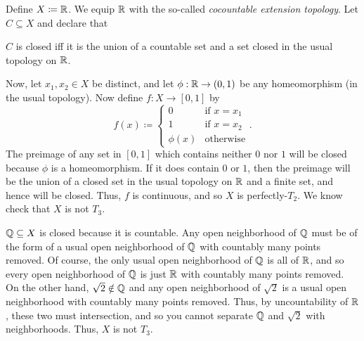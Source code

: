 \begin{exm}\label{CocountableExtensionTopology}
Define $X\coloneqq \mathbb{R}$.  We equip $\mathbb{R}$ with the so-called \emph{cocountable extension topology}.  Let $C\subseteq X$ and declare that
\begin{textequation}
$C$ is closed iff it is the union of a countable set and a set closed in the usual topology on $\mathbb{R}$.
\end{textequation}

Now, let $x_1,x_2\in X$ be distinct, and let $\phi :\mathbb{R} \rightarrow (0,1)$ be any homeomorphism (in the usual topology).  Now define $f:X\rightarrow [0,1]$ by
\begin{equation}
f(x)\coloneqq \begin{cases}0 & \text{if }x=x_1 \\ 1 & \text{if }x=x_2 \\ \phi (x) & \text{otherwise}\end{cases}.
\end{equation}
The preimage of any set in $[0,1]$ which contains neither $0$ nor $1$ will be closed because $\phi$ is a homeomorphism.  If it does contain $0$ or $1$, then the preimage will be the union of a closed set in the usual topology on $\mathbb{R}$ and a finite set, and hence will be closed.  Thus, $f$ is continuous, and so $X$ is perfectly-$T_2$.  We know check that $X$ is not $T_3$.

$\mathbb{Q} \subseteq X$ is closed because it is countable.  Any open neighborhood of $\mathbb{Q}$ must be of the form of a usual open neighborhood of $\mathbb{Q}$ with countably many points removed.  Of course, the only usual open neighborhood of $\mathbb{Q}$ is all of $\mathbb{R}$, and so every open neighborhood of $\mathbb{Q}$ is just $\mathbb{R}$ with countably many points removed.  On the other hand, $\sqrt{2}\notin \mathbb{Q}$ and any open neighborhood of $\sqrt{2}$ is a usual open neighborhood with countably many points removed.  Thus, by uncountability of $\mathbb{R}$, these two must intersection, and so you cannot separate $\mathbb{Q}$ and $\sqrt{2}$ with neighborhoods.  Thus, $X$ is not $T_3$.
\end{exm}
